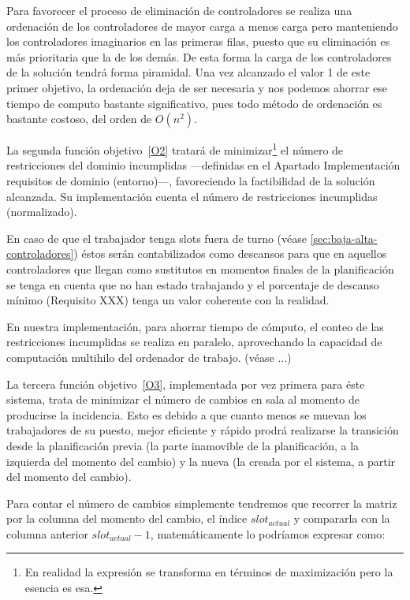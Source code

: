 Para favorecer el proceso de eliminación de controladores se realiza una ordenación de los controladores de mayor carga a menos carga pero manteniendo los controladores imaginarios en las primeras filas, puesto que su eliminación es más prioritaria que la de los demás. De esta forma la carga de los controladores de la solución tendrá forma piramidal. Una vez alcanzado el valor 1 de este primer objetivo, la ordenación deja de ser necesaria y nos podemos ahorrar ese tiempo de computo bastante significativo, pues todo método de ordenación es bastante costoso, del orden de $O(n^2)$. 

La segunda función objetivo~\ref{O2} tratará de minimizar\footnote{En realidad la expresión se transforma en términos de maximización pero la esencia es esa.} el número de restricciones del dominio incumplidas ---definidas en el Apartado Implementación requisitos de dominio (entorno)---, %
favoreciendo la factibilidad de la solución alcanzada. Su implementación cuenta el número de restricciones incumplidas (normalizado). 

En caso de que el trabajador tenga slots fuera de turno (véase \autoref{sec:baja-alta-controladores}) éstos serán contabilizados como descansos para que en aquellos controladores que llegan como sustitutos en momentos finales de la planificación se tenga en cuenta que no han estado trabajando y el porcentaje de descanso mínimo (Requisito XXX) %
tenga un valor coherente con la realidad.

En nuestra implementación, para ahorrar tiempo de cómputo, el conteo de las restricciones incumplidas se realiza en paralelo, aprovechando la capacidad de computación multihilo del ordenador de trabajo. (véase ...) %

La tercera función objetivo~\ref{O3}, implementada por vez primera para éste sistema, trata de minimizar el número de cambios en sala al momento de producirse la incidencia. Esto es debido a que cuanto menos se muevan los trabajadores de su puesto, mejor eficiente y rápido prodrá realizarse la transición desde la planificación previa (la parte inamovible de la planificación, a la izquierda del momento del cambio) y la nueva (la creada por el sistema, a partir del momento del cambio).

Para contar el número de cambios simplemente tendremos que recorrer la matriz por la columna del momento del cambio, el índice $slot_{actual}$ y compararla con la columna anterior $slot_{actual}-1$, matemáticamente lo podríamos expresar como:

